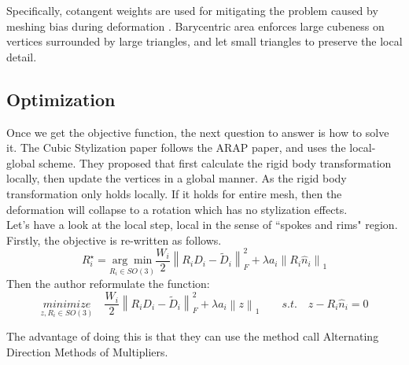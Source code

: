 \documentclass[a4paper,10pt]{article}
\begin{document}
Specifically, cotangent weights are used for mitigating the problem caused by meshing bias during deformation \cite{arap}. Barycentric area enforces large cubeness on vertices surrounded by large triangles, and let small triangles to preserve the local detail.

\subsection{Optimization}\label{opt}

Once we get the objective function, the next question to answer is how to solve it. The Cubic Stylization paper follows the ARAP paper, and uses the local-global scheme. They proposed that first calculate the rigid body transformation locally, then update the vertices in a global manner. As the rigid body transformation only holds locally. If it holds for entire mesh, then the deformation will collapse to a rotation which has no stylization effects. \\

Let's have a look at the local step, local in the sense of ``spokes and rims" region. Firstly, the objective is re-written as follows.
	\begin{equation}
		R_i^{\star} = \underset{R_i \in SO(3)}{\arg \min}\frac{W_{i}}{2}\left\lVert R_i D_i - \tilde{D}_i \right\rVert _F^2 +  \lambda a_i\left\lVert R_i \hat{n}_i\right\rVert _1
	\label{eq:local}
	\end{equation}
Then the author reformulate the function:
	\begin{equation}
		\underset{z, R_i \in SO(3)}{minimize} \quad \frac{W_{i}}{2}\left\lVert R_i D_i - \tilde{D}_i \right\rVert _F^2 +  \lambda a_i\left\lVert z\right\rVert _1
		\quad \quad
		s.t. \quad z-R_i \hat{n}_i = 0
		\label{eq:reformulate}
	\end{equation}

The advantage of doing this is that they can use the method call Alternating Direction Methods of Multipliers. 

\end{document}
